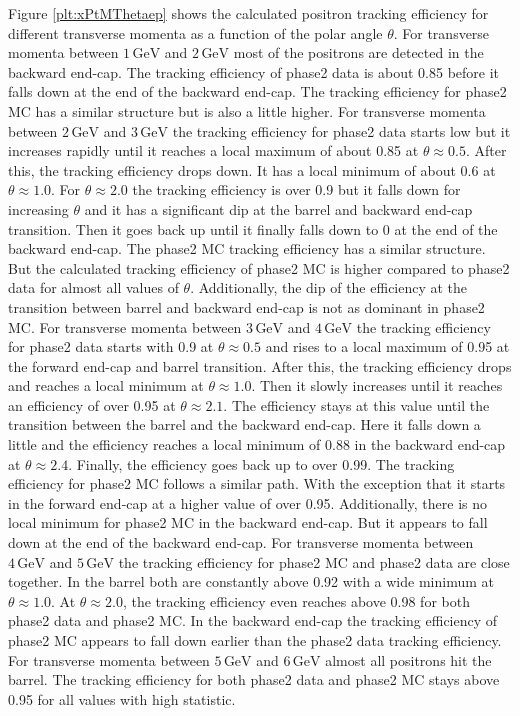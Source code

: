 \documentclass[a4paper,11pt,twosided,final,german,openbib,pdftex,listof=totoc,bibliography=totoc]{scrbook}
\begin{document}
Figure \ref{plt:xPtMThetaep} shows the calculated positron tracking efficiency for different transverse momenta as a function of the polar angle $\theta$. For transverse momenta between $1\,\textrm{GeV}$ and $2\,\textrm{GeV}$ most of the positrons are detected in the backward end-cap. The tracking efficiency of phase2 data is about 0.85 before it falls down at the end of the backward end-cap. The tracking efficiency for phase2 MC has a similar structure but is also a little higher.
For transverse momenta between $2\,\textrm{GeV}$ and $3\,\textrm{GeV}$ the tracking efficiency for phase2 data starts low  but it increases rapidly until it reaches a local maximum of about 0.85 at $\theta \approx 0.5$. After this, the tracking efficiency drops down. It has a local minimum of about 0.6 at $\theta \approx 1.0$. For $\theta \approx 2.0$ the tracking efficiency is over 0.9 but it falls down for increasing $\theta$ and it has a significant dip at the barrel and backward end-cap transition. Then it goes back up until it finally falls down to 0 at the end of the backward end-cap. The phase2 MC tracking efficiency has a similar structure. But the calculated tracking efficiency of phase2 MC is higher compared to phase2 data for almost all values of $\theta$. Additionally, the dip of the efficiency at the transition between barrel and backward end-cap is not as dominant in phase2 MC.
For transverse momenta between $3\,\textrm{GeV}$ and $4\,\textrm{GeV}$ the tracking efficiency for phase2 data starts with 0.9 at $\theta \approx 0.5$ and rises to a local maximum of 0.95 at the forward end-cap and barrel transition. After this, the tracking efficiency drops and reaches a local minimum at $\theta \approx 1.0$. Then it slowly increases until it reaches an efficiency of over 0.95 at $\theta \approx 2.1$. The efficiency stays at this value until the transition between the barrel and the backward end-cap. Here it falls down a little and the efficiency reaches a local minimum of 0.88 in the backward end-cap at $\theta \approx 2.4$. Finally, the efficiency goes back up to over 0.99. The tracking efficiency for phase2 MC follows a similar path. With the exception that it starts in the forward end-cap at a higher value of over 0.95. Additionally, there is no local minimum for phase2 MC in the backward end-cap. But it appears to fall down at the end of the backward end-cap.
For transverse momenta between $4\,\textrm{GeV}$  and $5\,\textrm{GeV}$ the tracking efficiency for phase2 MC and phase2 data are close together. In the barrel both are constantly above 0.92 with a wide minimum at $\theta \approx 1.0$. At $\theta \approx 2.0$, the tracking efficiency even reaches above 0.98 for both phase2 data and phase2 MC. In the backward end-cap the tracking efficiency of phase2 MC appears to fall down earlier than the phase2 data tracking efficiency.
For transverse momenta between $5\,\textrm{GeV}$ and $6\,\textrm{GeV}$ almost all positrons hit the barrel. The tracking efficiency for both phase2 data and phase2 MC stays above 0.95 for all values with high statistic.
\end{document}
